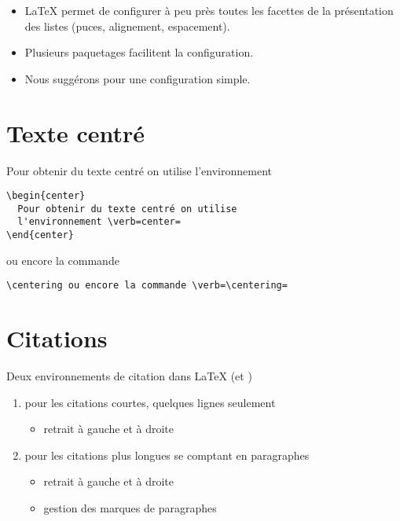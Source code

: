 \begin{conseil}
  \begin{itemize}
  \item {\LaTeX} permet de configurer à peu près toutes les facettes
    de la présentation des listes (puces, alignement, espacement).
  \item Plusieurs paquetages facilitent la configuration.
  \item Nous suggérons  pour une configuration simple.
  \end{itemize}
\end{conseil}


\section{Texte centré}

\begin{center}
  Pour obtenir du texte centré on utilise l'environnement
\end{center}

\begin{lstlisting}
\begin{center}
  Pour obtenir du texte centré on utilise
  l'environnement \verb=center=
\end{center}
\end{lstlisting}

{\centering ou encore la commande \cmd{\centering}}

\begin{lstlisting}
\centering ou encore la commande \verb=\centering=
\end{lstlisting}


\section{Citations}

Deux environnements de citation dans {\LaTeX} (et )
\begin{enumerate}
\item {} pour les citations courtes, quelques lignes seulement
  \begin{itemize}
  \item retrait à gauche et à droite
  \end{itemize}
\item {} pour les citations plus longues se comptant
  en paragraphes
  \begin{itemize}
  \item retrait à gauche et à droite
  \item gestion des marques de paragraphes
  \end{itemize}
\end{enumerate}


